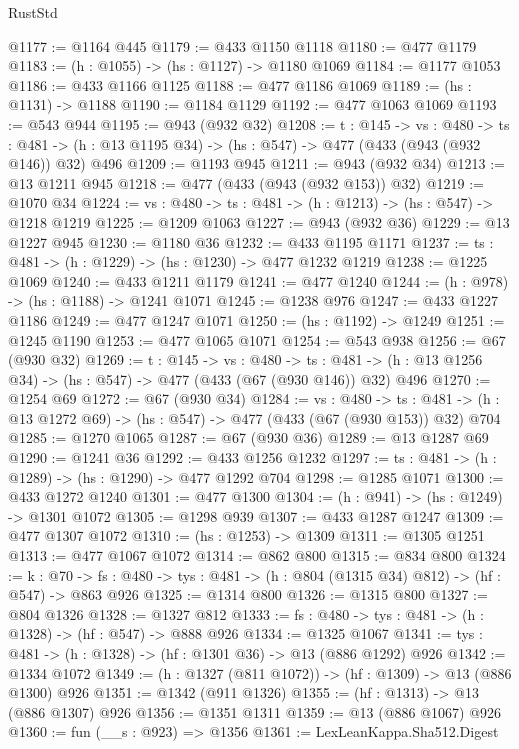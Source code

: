 \begin{lexlean}{RustStd}
\begin{coremodule}
{\begin{coremodule}
{{{{{{{{{{{{{{{{@1177 := @1164 @445
@1179 := @433 @1150 @1118
@1180 := @477 @1179
@1183 := (h : @1055) -> (hs : @1127) -> @1180 @1069
@1184 := @1177 @1053
@1186 := @433 @1166 @1125
@1188 := @477 @1186 @1069
@1189 := (hs : @1131) -> @1188
@1190 := @1184 @1129
@1192 := @477 @1063 @1069
@1193 := @543 @944
@1195 := @943 (@932 @32)
@1208 := {t : @145} ->
  {vs : @480} ->
  {ts : @481} -> (h : @13 @1195 @34) -> (hs : @547) -> @477 (@433 (@943 (@932 @146)) @32) @496
@1209 := @1193 @945
@1211 := @943 (@932 @34)
@1213 := @13 @1211 @945
@1218 := @477 (@433 (@943 (@932 @153)) @32)
@1219 := @1070 @34
@1224 := {vs : @480} -> {ts : @481} -> (h : @1213) -> (hs : @547) -> @1218 @1219
@1225 := @1209 @1063
@1227 := @943 (@932 @36)
@1229 := @13 @1227 @945
@1230 := @1180 @36
@1232 := @433 @1195 @1171
@1237 := {ts : @481} -> (h : @1229) -> (hs : @1230) -> @477 @1232 @1219
@1238 := @1225 @1069
@1240 := @433 @1211 @1179
@1241 := @477 @1240
@1244 := (h : @978) -> (hs : @1188) -> @1241 @1071
@1245 := @1238 @976
@1247 := @433 @1227 @1186
@1249 := @477 @1247 @1071
@1250 := (hs : @1192) -> @1249
@1251 := @1245 @1190
@1253 := @477 @1065 @1071
@1254 := @543 @938
@1256 := @67 (@930 @32)
@1269 := {t : @145} ->
  {vs : @480} ->
  {ts : @481} -> (h : @13 @1256 @34) -> (hs : @547) -> @477 (@433 (@67 (@930 @146)) @32) @496
@1270 := @1254 @69
@1272 := @67 (@930 @34)
@1284 := {vs : @480} ->
  {ts : @481} -> (h : @13 @1272 @69) -> (hs : @547) -> @477 (@433 (@67 (@930 @153)) @32) @704
@1285 := @1270 @1065
@1287 := @67 (@930 @36)
@1289 := @13 @1287 @69
@1290 := @1241 @36
@1292 := @433 @1256 @1232
@1297 := {ts : @481} -> (h : @1289) -> (hs : @1290) -> @477 @1292 @704
@1298 := @1285 @1071
@1300 := @433 @1272 @1240
@1301 := @477 @1300
@1304 := (h : @941) -> (hs : @1249) -> @1301 @1072
@1305 := @1298 @939
@1307 := @433 @1287 @1247
@1309 := @477 @1307 @1072
@1310 := (hs : @1253) -> @1309
@1311 := @1305 @1251
@1313 := @477 @1067 @1072
@1314 := @862 @800
@1315 := @834 @800
@1324 := {k : @70} ->
  {fs : @480} -> {tys : @481} -> (h : @804 (@1315 @34) @812) -> (hf : @547) -> @863 @926
@1325 := @1314 @800
@1326 := @1315 @800
@1327 := @804 @1326
@1328 := @1327 @812
@1333 := {fs : @480} -> {tys : @481} -> (h : @1328) -> (hf : @547) -> @888 @926
@1334 := @1325 @1067
@1341 := {tys : @481} -> (h : @1328) -> (hf : @1301 @36) -> @13 (@886 @1292) @926
@1342 := @1334 @1072
@1349 := (h : @1327 (@811 @1072)) -> (hf : @1309) -> @13 (@886 @1300) @926
@1351 := @1342 (@911 @1326)
@1355 := (hf : @1313) -> @13 (@886 @1307) @926
@1356 := @1351 @1311
@1359 := @13 (@886 @1067) @926
@1360 := fun (__s : @923) => @1356
@1361 := LexLeanKappa.Sha512.Digest
}}}}}}}}}}}}}}}}
\end{coremodule}}
\end{coremodule}
\end{lexlean}
